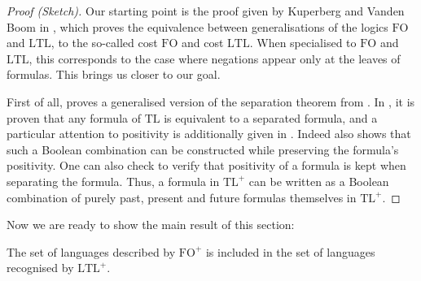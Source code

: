 \documentclass[a4paper,UKenglish,cleveref, autoref, thm-restate]{lipics-v2021}
\newcommand{\FO}{\mathrm{FO}}
\newcommand{\FOp}{\FO^+}
\newcommand{\LTL}{\mathrm{LTL}}
\newcommand{\LTLp}{\LTL^+}
\newcommand{\TL}{\mathrm{TL}}
\newcommand{\TLp}{\TL^+}
\begin{document}
\begin{proof}[Proof (Sketch)]

    Our starting point is the proof given by Kuperberg and Vanden Boom in \cite[lemma 5]{FOtoLTL}, which proves the equivalence between generalisations of the logics $\FO$ and $\LTL$, to the so-called cost $\FO$ and cost $\LTL$. When specialised to $\FO$ and $\LTL$, this corresponds to the case where negations appear only at the leaves of formulas. This brings us closer to our goal.

    First of all, \cite{FOtoLTL} proves a generalised version of the separation theorem from \cite{sep}.
    In \cite{sep}, it is proven that any formula of $\TL$ is equivalent to a separated formula, and a particular attention to positivity is additionally given in \cite{FOtoLTL}.
    Indeed \cite{FOtoLTL} also shows that such a Boolean combination can be constructed while preserving the formula's positivity.
    One can also check \cite{OliveiraR21} to verify that positivity of a formula is kept when separating the formula.
    Thus, a formula in $\TLp$ can be written as a Boolean combination of purely past, present and future formulas themselves in $\TLp$.
\end{proof}





Now we are ready to show the main result of this section:


\begin{lemma}\label{FOtoLTL}
    The set of languages described by $\FOp$ is included in the set of languages recognised by $\LTLp$.
\end{lemma}
\end{document}
